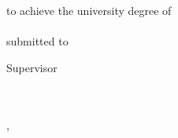 \begin{titlepage}

\large  %

\begin{center}
~
\vfill\vfill\vfill

\sffamily


\myauthor

\vfill
{\Huge\bfseries\mytitle}

\vfill\vfill\vfill\vfill

{\bfseries\myworktitle}\\
\vfill
to achieve the university degree of\\
{\mygrade}\\
\vfill
submitted to\\
{\bfseries\myuniversity}

\vfill\vfill\vfill
\vfill\vfill\vfill

Supervisor\\
\mysupervisor\\
\vfill
\vfill
\vfill
\myinstitute\\
\vfill

\myfaculty

\vfill\vfill\vfill

{\normalsize\mysubmissiontown, \mysubmissionmonth~\mysubmissionyear}

\end{center}
\end{titlepage}

\newpage
